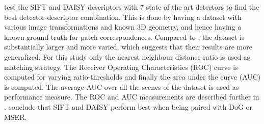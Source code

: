 \documentclass[thesis.tex]{subfiles}
\begin{document}
\citet{dahl2011finding} test the SIFT and DAISY descriptors with 7 state of the art detectors to find the best detector-descriptor combination. This is done by having a dataset with various image transformations and known 3D geometry, and hence having a known ground truth for patch correspondences. Compared to \citet{mikolajczyk2005performance}, the dataset is substantially larger and more varied, which suggests that their results are more generalized. For this study only the nearest neighbour distance ratio is used as matching strategy. The Receiver Operating Characteristics (ROC) curve is computed for varying ratio-thresholds and finally the area under the curve (AUC) is computed. The average AUC over all the scenes of the dataset is used as performance measure. The ROC and AUC measurements are described further in . \citet{dahl2011finding} conclude that SIFT and DAISY perform best when being paired with DoG or MSER.

\subbibliography
\end{document}
